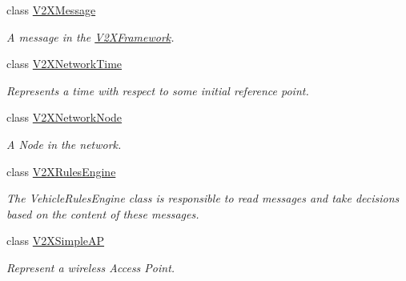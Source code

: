 \begin{DoxyCompactItemize}
class \hyperlink{classV2XMessage}{V2\+X\+Message}
\begin{DoxyCompactList}\small\item\em A message in the \hyperlink{classV2XFramework}{V2\+X\+Framework}. \end{DoxyCompactList}\item 
class \hyperlink{classV2XNetworkTime}{V2\+X\+Network\+Time}
\begin{DoxyCompactList}\small\item\em Represents a time with respect to some initial reference point. \end{DoxyCompactList}\item 
class \hyperlink{classV2XNetworkNode}{V2\+X\+Network\+Node}
\begin{DoxyCompactList}\small\item\em A Node in the network. \end{DoxyCompactList}\item 
class \hyperlink{classV2XRulesEngine}{V2\+X\+Rules\+Engine}
\begin{DoxyCompactList}\small\item\em The Vehicle\+Rules\+Engine class is responsible to read messages and take decisions based on the content of these messages. \end{DoxyCompactList}\item 
class \hyperlink{classV2XSimpleAP}{V2\+X\+Simple\+AP}
\begin{DoxyCompactList}\small\item\em Represent a wireless Access Point. \end{DoxyCompactList}\end{DoxyCompactItemize}
